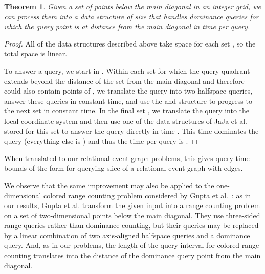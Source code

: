 \documentclass[11pt]{article}
\newtheorem{theorem}{Theorem}
\begin{document}
\begin{theorem}
Given a set of  points below the main diagonal in an  integer grid, we can process them into a data structure of size  that handles dominance queries for which the query point is at distance  from the main diagonal in time  per query.
\end{theorem}

\begin{proof}
All of the data structures described above take space  for each set , so the total space is linear.

To answer a query, we start in . Within each set  for which the query quadrant extends beyond the distance of the set from the main diagonal and therefore could also contain points of , we translate the query into two halfspace queries, answer these queries in constant time, and use the  and  structure to progress to the next set  in constant time. In the final set , we translate the query into the local coordinate system and then use one of the data structures of JaJa et al.{} stored for this set to answer the query directly in time . This  time dominates the query (everything else is ) and thus the time per query is .
\end{proof}

When translated to our relational event graph problems, this gives query time bounds of the form  for querying slice  of a relational event graph with  edges.

We observe that the same improvement may also be applied to the one-dimensional colored range counting problem considered by Gupta et al.~\cite{ColorRangeQueries}: as in our results, Gupta et al.{} transform the given input into a range counting problem on a set of two-dimensional points below the main diagonal. They use three-sided range queries rather than dominance counting, but their queries may be replaced by a linear combination of two axis-aligned halfspace queries and a dominance query. And, as in our problems, the length of the query interval for colored range counting translates into the distance of the dominance query point from the main diagonal.
\end{document}
